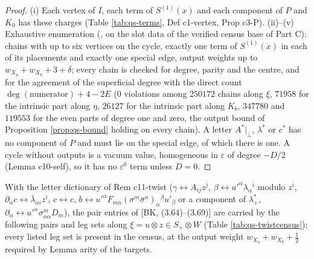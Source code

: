 \begin{proof}
(i) Each vertex of $I$, each term of $S^{(1)}(x)$ and each component of $P$ and $K_0$ has these charges (Table \ref{tab:qs-terms}, Def c1-vertex, Prop c3-P). (ii)--(v) Exhaustive enumeration (, on the slot data of the verified census base of Part C): chains with up to six vertices on the cycle, exactly one term of $S^{(1)}(x)$ in each of its placements and exactly one special edge, output weights up to $w_{X_a}+w_{X_b}+3+\delta$; every chain is checked for degree, parity and the centre, and for the agreement of the superficial degree with the direct count $\deg(\text{numerator})+4-2E$ ($0$ violations among $250172$ chains along $\xi$, $71958$ for the intrinsic part along $\eta$, $26127$ for the intrinsic part along $K_b$, $347780$ and $119553$ for the even parts of degree one and zero, the output bound of Proposition \ref{prop:qs-bound} holding on every chain). A letter $A^*|_\perp$, $\lambda^*$ or $c^*$ has no component of $P$ and must lie on the special edge, of which there is one. A cycle without outputs is a vacuum value, homogeneous in $\varepsilon$ of degree $-D/2$ (Lemma c10-self), so it has no $\varepsilon^0$ term unless $D=0$.
\end{proof}



\begin{remark}
\label{rem:qs-twistpairs}
With the letter dictionary of Rem c11-twist ($\gamma\leftrightarrow A_{ij}z^j$, $\beta\leftrightarrow u'^\alpha\lambda_\alpha{}^i$ modulo $z^i$, $\partial_{\dot\alpha}c\leftrightarrow\bar\lambda_{\dot\alpha i}z^i$, $c\leftrightarrow c$, $b\leftrightarrow u'^\alpha F_{mn}(\sigma^m\bar\sigma^n)_\alpha{}^\beta u'_\beta$ or a component of $\lambda^*_+$, $\partial_{\dot\alpha}\leftrightarrow u'^\alpha\sigma^m_{\alpha\dot\alpha}D_m$), the pair entries of [BK, (3.64)--(3.69)] are carried by the following pairs and leg sets along $\xi=u\otimes z\in S_+\otimes W$ (Table \ref{tab:qs-twistcensus}); every listed leg set is present in the census, at the output weight $w_{X_a}+w_{X_b}+\tfrac12$ required by Lemma arity of the targets.
\end{remark}


